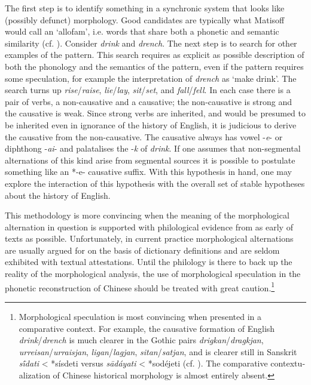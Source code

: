 The first step is to identify something in a synchronic system that
looks like (possibly defunct) morphology. Good candidates are typically
what Matisoff would call an `allofam', i.e. words that share both a
phonetic and semantic similarity 
(cf. \cite{Matisoff1978}). Consider
 \emph{drink} and \emph{drench}. The next step is to search for other
examples of the pattern. This search requires as explicit as possible
description of both the phonology and the semantics of the pattern, even
if the pattern requires some speculation, for example the interpretation
of \emph{drench} as `make drink'. The search turns up
 \emph{rise}/\emph{raise},  \emph{lie}/\emph{lay},  \emph{sit}/\emph{set},
and \emph{fall}/\emph{fell}. In each case there is a pair of verbs, a
non-causative and a causative; the non-causative is strong and the
causative is weak. Since strong verbs are inherited, and would be
presumed to be inherited even in ignorance of the history of English, it
is judicious to derive the causative from the non-causative. The
causative always has vowel -\emph{e}- or diphthong -\emph{ai}- and
palatalises the -\emph{k} of \emph{drink}. If one assumes that
non-segmental alternations of this kind arise from segmental sources it
is possible to postulate something like an *-e- causative suffix. With
this hypothesis in hand, one may explore the interaction of this
hypothesis with the overall set of stable hypotheses about the history
of English.

This methodology is more convincing when the meaning of the
morpho­logical alternation in question is supported with philological
evidence from as early of texts as possible. Unfortunately, in current
practice morphological alternations are usually argued for on the basis
of dictionary definitions and are seldom exhibited with textual
attestations. Until the philology is there to back up the reality of the
morphological analysis, the use of morpho­logical speculation in the
phonetic reconstruction of Chinese should be treated with great
caution.\footnote{Morphological speculation is most convincing when
  presented in a comparative context. For example, the causative
  formation of English \emph{drink}/\emph{drench} is much clearer in the
  Gothic pairs \emph{drigkan}/\emph{dragkjan},
   \emph{urreisan}/\emph{urraisjan},  \emph{ligan}/\emph{lagjan},
   \emph{sitan}/\emph{satjan}, and is clearer still in Sanskrit
   \emph{sī́dati} \textless{} *sísdeti versus \emph{sādáyati} \textless{}
  *sodéi̯eti (cf.
  \cite[98 §5.32]{Fortson2010}). The comparative
  con­tex­tu­aliza­tion of Chinese historical morphology is almost
  entirely absent.}

